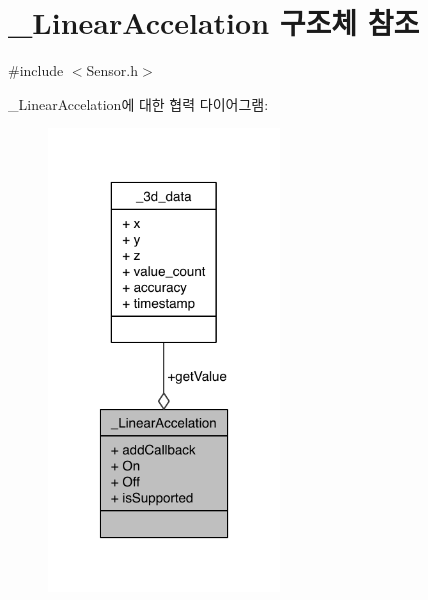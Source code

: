 \hypertarget{struct___linear_accelation}{\section{\-\_\-\-Linear\-Accelation 구조체 참조}
\label{struct___linear_accelation}
}


{\ttfamily \#include $<$Sensor.\-h$>$}



\-\_\-\-Linear\-Accelation에 대한 협력 다이어그램\-:
\nopagebreak
\begin{figure}[H]
\begin{center}
\leavevmode
\includegraphics[width=174pt]{d2/d13/struct___linear_accelation__coll__graph}
\end{center}
\end{figure}
